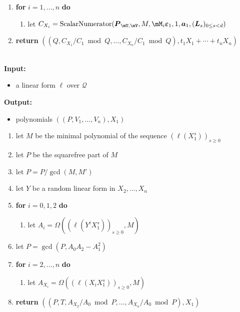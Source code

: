 \documentclass[12pt]{article}
\newcommand{\mat}[1]{\bm{\MakeUppercase{#1}}} %
\newcommand{\row}[1]{\bm{\MakeLowercase{#1}}} %
\newcommand{\col}[1]{\bm{\MakeLowercase{#1}}} %
\newcommand{\mf}{Y}
\newcommand{\residueI}{\mathscr{Q}}
\newcommand{\sqfree}{Q}
\begin{document}
\begin{algorithm}[H]
\begin{enumerate}
\begin{enumerate}
    \end{enumerate}
  \item\label{X1step10} \textbf{for} $i=1,\dots,n$ \textbf{do}
    \begin{enumerate}
     \item let $C_{X_i} = \mathrm{ScalarNumerator}(\mat{P}_{\mU,\mV}, M, \mM_i\col{\varepsilon}_1, 1, \row{a}_1, (\mat{L}_s)_{0 \le s <d})$
    \end{enumerate}
\item\label{X1step11}     \textbf{return} $((\sqfree, C_{X_1}/ C_1 \bmod \sqfree, \dots, C_{X_n}/ C_{1} \bmod \sqfree),t_1 X_1 + \cdots + t_n X_n)$
  \end{enumerate}  \label{algo:X1block-sparse-fglm}
\end{algorithm}

\begin{algorithm}[H]
	\caption{$\mathsf{ParametrizationX}_1(\ell)$}
	~\\
	{\bf Input:} \vspace{-0.5em}
	\begin{itemize}\setlength\itemsep{0em}
		\item a linear form $\ell$ over $\residueI$
	\end{itemize}
	{\bf Output:}  \vspace{-0.5em}
        \begin{itemize}
        \item polynomials $((P,V_1,\dots,V_n),X_1)$
        \end{itemize}
	\begin{enumerate}\setlength\itemsep{0em}
		\item let $M$ be the minimal polynomial of the sequence $(\ell(X_1^s))_{s \ge 0}$
		\item let $P$ be the squarefree part of $M$
                \item let $P = P /\gcd(M, M')$
		\item let $\mf$ be a random linear form in $X_2,\dots,X_n$
		\item \textbf{for} $i=0,1,2$ \textbf{do}
		\begin{enumerate}
			\item let $A_i = \Omega((\ell(\mf^i X_1^s))_{s\ge0},M)$
		\end{enumerate}
		\item\label{step:updateP} let $P = \gcd(P, A_0  A_2- A_1^2)$
		\item \textbf{for} $i=2,\dots,n$ \textbf{do}
		\begin{enumerate}
			\item let $A_{X_i} = \Omega((\ell(X_i X_1^s))_{s\ge0},M)$
		\end{enumerate}
		\item \textbf{return} $((P,T,A_{X_2}/ A_0 \bmod P, \dots,A_{X_n}/A_{0} \bmod P),X_1)$
	\end{enumerate}
	\label{algo:para}
\end{algorithm}
\end{document}
